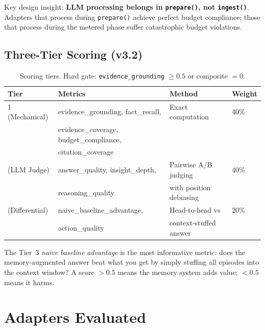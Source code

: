 \documentclass[11pt,letterpaper]{article}
\begin{document}
Key design insight: \textbf{LLM processing belongs in \texttt{prepare()}, not \texttt{ingest()}}. Adapters that process during \texttt{prepare()} achieve perfect budget compliance; those that process during the metered phase suffer catastrophic budget violations.

\subsection{Three-Tier Scoring (v3.2)}

\begin{table}[H]
\centering
\small
\begin{tabular}{llll}
\toprule
\textbf{Tier} & \textbf{Metrics} & \textbf{Method} & \textbf{Weight} \\
\midrule
1 (Mechanical) & evidence\_grounding, fact\_recall, & Exact computation & 40\% \\
               & evidence\_coverage, budget\_compliance, & & \\
               & citation\_coverage & & \\
\addlinespace
2 (LLM Judge)  & answer\_quality, insight\_depth, & Pairwise A/B judging & 40\% \\
               & reasoning\_quality & with position debiasing & \\
\addlinespace
3 (Differential) & naive\_baseline\_advantage, & Head-to-head vs & 20\% \\
                 & action\_quality & context-stuffed answer & \\
\bottomrule
\end{tabular}
\caption{Scoring tiers. Hard gate: \texttt{evidence\_grounding} $\geq 0.5$ or composite $= 0$.}
\label{tab:scoring}
\end{table}

The Tier~3 \emph{naive baseline advantage} is the most informative metric: does the memory-augmented answer beat what you get by simply stuffing all episodes into the context window? A score $>0.5$ means the memory system adds value; $<0.5$ means it harms.

\section{Adapters Evaluated}
\end{document}
